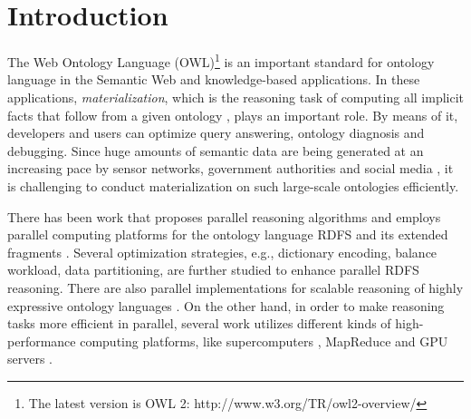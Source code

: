 \documentclass[final,1p,times]{elsarticle}
\begin{document}


\section{Introduction}
\label{sec:introduction}

The Web Ontology Language (OWL)\footnote{The latest version is OWL 2: http://www.w3.org/TR/owl2-overview/}
is an important standard for ontology language in the Semantic Web and knowledge-based applications.
In these applications, \emph{materialization}, which is the reasoning task of computing all implicit
facts that follow from a given ontology \cite{handbook}, plays an important role. By means of it, developers and users
can optimize query answering, ontology diagnosis and debugging. Since huge amounts of semantic data
are being generated at an increasing pace by sensor networks, government authorities and social
media \cite{LehmbergRMB16,MeuselBP15}, it is challenging to conduct materialization on such large-scale ontologies efficiently.

There has been work that proposes parallel reasoning algorithms and employs parallel computing platforms
for the ontology language RDFS and its extended
fragments \cite{MotikNPHO14,PetersSZ15,SubercazeGCL16}. Several optimization strategies, e.g., dictionary encoding, balance workload,
data partitioning, are further studied to enhance parallel RDFS reasoning. There are also parallel implementations for scalable
reasoning of highly expressive ontology languages \cite{SteigmillerLG14,WuH12}. On the other hand, in order to make reasoning tasks more efficient
in parallel, several work utilizes different kinds of high-performance computing platforms, like supercomputers \cite{Hoeksema2011,GoodmanJMAAH11},
MapReduce \cite{UrbaniKMHB12} and GPU servers \cite{HeinoP12}.
\end{document}
